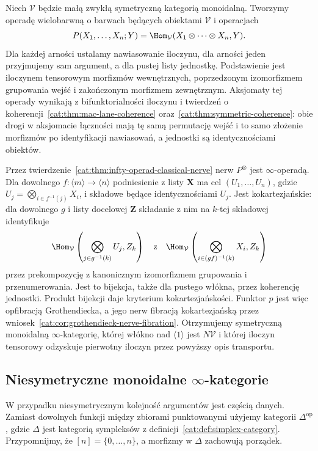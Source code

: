 \begin{przyklad}\label{cat:ex:infty-monoidal-ordinary}
Niech $\mathcal V$ będzie małą zwykłą symetryczną kategorią monoidalną. Tworzymy operadę wielobarwną o barwach będących obiektami $\mathcal V$ i operacjach
\[
 P(X_1,\ldots,X_n;Y)=
 \Hom_{\mathcal V}(X_1\otimes\cdots\otimes X_n,Y).
\]
Dla każdej arności ustalamy nawiasowanie iloczynu, dla arności jeden przyjmujemy sam argument, a dla pustej listy jednostkę. Podstawienie jest iloczynem tensorowym morfizmów wewnętrznych, poprzedzonym izomorfizmem grupowania wejść i zakończonym morfizmem zewnętrznym. Aksjomaty tej operady wynikają z bifunktorialności iloczynu i twierdzeń o koherencji~\ref{cat:thm:mac-lane-coherence} oraz~\ref{cat:thm:symmetric-coherence}: obie drogi w aksjomacie łączności mają tę samą permutację wejść i to samo złożenie morfizmów po identyfikacji nawiasowań, a jednostki są identycznościami obiektów.

Przez twierdzenie~\ref{cat:thm:infty-operad-classical-nerve} nerw $P^\otimes$ jest $\infty$-operadą. Dla dowolnego $f:\langle m\rangle\to\langle n\rangle$ podniesienie z listy $\mathbf X$ ma cel $(U_1,\ldots,U_n)$, gdzie $U_j=\bigotimes_{i\in f^{-1}(j)} X_i$, i składowe będące identycznościami $U_j$. Jest kokartezjańskie: dla dowolnego $g$ i listy docelowej $\mathbf Z$ składanie z nim na $k$-tej składowej identyfikuje
\[
 \Hom_{\mathcal V}\left(\bigotimes_{j\in g^{-1}(k)}U_j,Z_k\right)
 \quad\text{z}\quad
 \Hom_{\mathcal V}\left(\bigotimes_{i\in(gf)^{-1}(k)}X_i,Z_k\right)
\]
przez prekompozycję z kanonicznym izomorfizmem grupowania i przenumerowania. Jest to bijekcja, także dla pustego włókna, przez koherencję jednostki. Produkt bijekcji daje kryterium kokartezjańskości. Funktor $p$ jest więc opfibracją Grothendiecka, a jego nerw fibracją kokartezjańską przez wniosek~\ref{cat:cor:grothendieck-nerve-fibration}. Otrzymujemy symetryczną monoidalną $\infty$-kategorię, której włókno nad $\langle1\rangle$ jest $N\mathcal V$ i której iloczyn tensorowy odzyskuje pierwotny iloczyn przez powyższy opis transportu.
\end{przyklad}

\subsection{Niesymetryczne monoidalne \texorpdfstring{$\infty$-kategorie}{kategorie wyższe}}

W przypadku niesymetrycznym kolejność argumentów jest częścią danych. Zamiast dowolnych funkcji między zbiorami punktowanymi użyjemy kategorii $\Delta^{\mathrm{op}}$, gdzie $\Delta$ jest kategorią sympleksów z definicji~\ref{cat:def:simplex-category}. Przypomnijmy, że $[n]=\{0,\ldots,n\}$, a morfizmy w $\Delta$ zachowują porządek.

